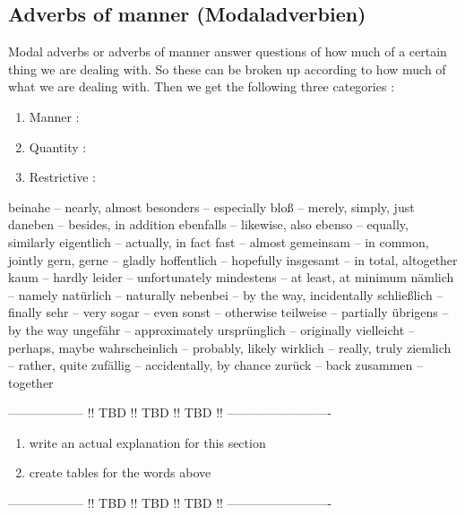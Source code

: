 \documentclass[a4paper,12pt]{article}
\begin{document}
\subsection{\bf{Adverbs of manner (Modaladverbien)}}
\begin{adjustwidth}{2em}{0pt}
\label{sec:adverbs_of_manner}

Modal adverbs or adverbs of manner answer questions of how much of a
certain thing we are dealing with. So these can be broken up according to how
much of what we are dealing with. Then we get the following three categories :

\begin{enumerate}[noitemsep]
	\item Manner : 
	\item Quantity :
	\item Restrictive :
\end{enumerate}

beinahe -- nearly, almost
besonders -- especially
bloß -- merely, simply, just
daneben -- besides, in addition
ebenfalls -- likewise, also
ebenso -- equally, similarly
eigentlich -- actually, in fact
fast -- almost
gemeinsam -- in common, jointly
gern, gerne -- gladly
hoffentlich -- hopefully
insgesamt -- in total, altogether
kaum -- hardly
leider -- unfortunately
mindestens -- at least, at minimum
nämlich -- namely
natürlich -- naturally
nebenbei -- by the way, incidentally
schließlich -- finally
sehr -- very
sogar -- even
sonst -- otherwise
teilweise -- partially
übrigens -- by the way
ungefähr -- approximately
ursprünglich -- originally
vielleicht -- perhaps, maybe
wahrscheinlich -- probably, likely
wirklich -- really, truly
ziemlich -- rather, quite
zufällig -- accidentally, by chance
zurück -- back
zusammen -- together


\begin{center}
\color{red}
------------------ !! TBD !! TBD !! TBD !! -------------------------

\begin{enumerate}[noitemsep]
	\item write an actual explanation for this section
	\item create tables for the words above
\end{enumerate}

------------------ !! TBD !! TBD !! TBD !! -------------------------
\color{black}
\end{center}

\end{adjustwidth}
\end{document}

